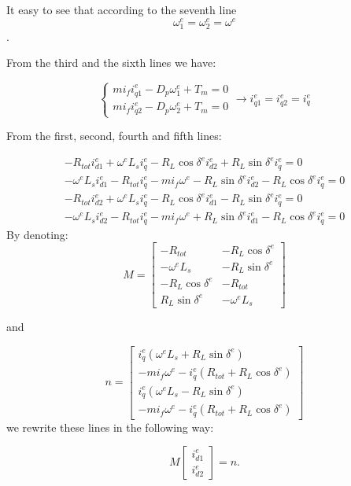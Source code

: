 \documentclass[letterpaper, 10 pt, conference]{ieeeconf}
\begin{document}
It easy to see that according to the seventh line $$\omega_{1}^{e}=\omega_{2}^{e}=\omega^{e}$$.

From the third and the sixth lines we have: 

$$
\left\{ \begin{array}{c}
mi_{f}i_{q1}^{e}-D_{p}\omega_{1}^{e}+T_{m}=0\\
mi_{f}i_{q2}^{e}-D_{p}\omega_{2}^{e}+T_{m}=0
\end{array}\right.\longrightarrow i_{q1}^{e}=i_{q2}^{e}=i_{q}^{e}
$$

From the first, second, fourth and fifth lines:

$$
 \begin{array}{c}
-R_{tot}i_{d1}^{e}+\omega^{e}L_{s}i_{q}^{e}-R_{L}\cos\delta^{e}i_{d2}^{e}+R_{L}\sin\delta^{e}i_{q}^{e}=0\\
-\omega^{e}L_{s}i_{d1}^{e}-R_{tot}i_{q}^{e}-mi_{f}\omega^{e}-R_{L}\sin\delta^{e}i_{d2}^{e}-R_{L}\cos\delta^{e}i_{q}^{e}=0\\
-R_{tot}i_{d2}^{e}+\omega^{e}L_{s}i_{q}^{e}-R_{L}\cos\delta^{e}i_{d1}^{e}-R_{L}\sin\delta^{e}i_{q}^{e}=0\\
-\omega^{e}L_{s}i_{d2}^{e}-R_{tot}i_{q}^{e}-mi_{f}\omega^{e}+R_{L}\sin\delta^{e}i_{d1}^{e}-R_{L}\cos\delta^{e}i_{q}^{e}=0
\end{array}
$$
By denoting:
\[
M=\left[\begin{array}{cc}
-R_{tot} & -R_{L}\cos\delta^{e}\\
-\omega^{e}L_{s} & -R_{L}\sin\delta^{e}\\
-R_{L}\cos\delta^{e} & -R_{tot}\\
R_{L}\sin\delta^{e} & -\omega^{e}L_{s}
\end{array}\right]
\]

and 

\[
n=\left[\begin{array}{c}
i_{q}^{e}\left(\omega^{e}L_{s}+R_{L}\sin\delta^{e}\right)\\
-mi_{f}\omega^{e}-i_{q}^{e}\left(R_{tot}+R_{L}\cos\delta^{e}\right)\\
i_{q}^{e}\left(\omega^{e}L_{s}-R_{L}\sin\delta^{e}\right)\\
-mi_{f}\omega^{e}-i_{q}^{e}\left(R_{tot}+R_{L}\cos\delta^{e}\right)
\end{array}\right]
\]
we rewrite these lines in the following way:

\begin{equation}
M\left[\begin{array}{c}
i_{d1}^{e}\\
i_{d2}^{e}
\end{array}\right]=n.\label{eq:equilibrium_system}
\end{equation}
\end{document}
